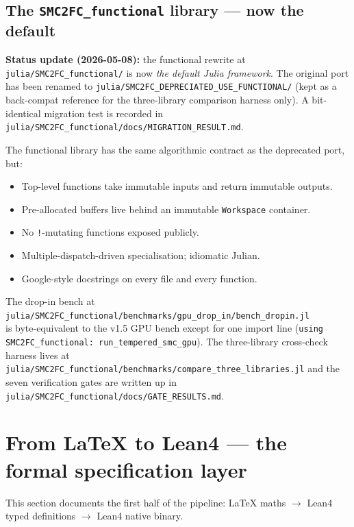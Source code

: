 \documentclass[11pt,a4paper]{article}
\begin{document}
\subsection{The \texttt{SMC2FC\_functional} library --- now the default}

\textbf{Status update (2026-05-08):} the functional rewrite at
\texttt{julia/SMC2FC\_functional/} is now \emph{the default Julia
framework}. The original port has been renamed to
\texttt{julia/SMC2FC\_DEPRECIATED\_USE\_FUNCTIONAL/} (kept as a
back-compat reference for the three-library comparison harness only).
A bit-identical migration test is recorded in
\texttt{julia/SMC2FC\_functional/docs/MIGRATION\_RESULT.md}.

The functional library has the same algorithmic contract as the
deprecated port, but:

\begin{itemize}[itemsep=2pt]
  \item Top-level functions take immutable inputs and return
        immutable outputs.
  \item Pre-allocated buffers live behind an immutable
        \texttt{Workspace} container.
  \item No \texttt{!}-mutating functions exposed publicly.
  \item Multiple-dispatch-driven specialisation; idiomatic Julian.
  \item Google-style docstrings on every file and every function.
\end{itemize}

The drop-in bench at\\
\texttt{julia/SMC2FC\_functional/benchmarks/gpu\_drop\_in/bench\_dropin.jl}\\
is byte-equivalent to the v1.5 GPU bench except for one import line
(\texttt{using SMC2FC\_functional: run\_tempered\_smc\_gpu}). The
three-library cross-check harness lives at\\
\texttt{julia/SMC2FC\_functional/benchmarks/compare\_three\_libraries.jl}
and the seven verification gates are written up in
\texttt{julia/SMC2FC\_functional/docs/GATE\_RESULTS.md}.


\section{From LaTeX to Lean4 --- the formal specification layer}
\label{sec:lean4}

This section documents the first half of the pipeline:
LaTeX maths $\to$ Lean4 typed definitions $\to$ Lean4 native binary.
\end{document}
